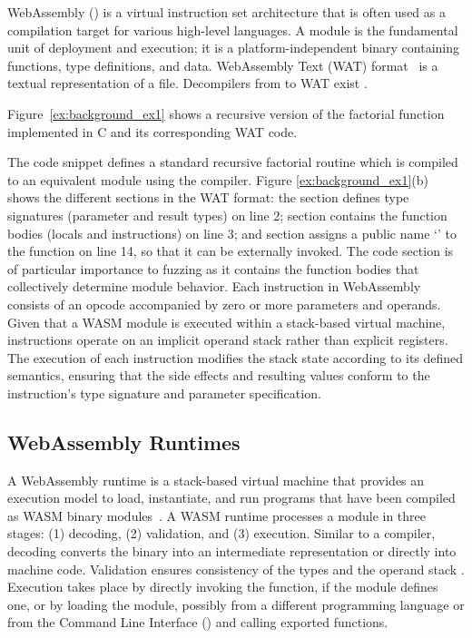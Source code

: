 \documentclass[lettersize,journal]{IEEEtran}
\begin{document}
WebAssembly (\wasm{}) is a virtual instruction set architecture that is often used as a compilation target for various high-level languages. A \wasm{} module is the fundamental unit of deployment and execution; it is a platform-independent binary containing functions, type definitions, and data. WebAssembly Text (WAT) format~\cite{spec_wat} is a textual representation of a \wasm{} file. Decompilers from \wasm{} to WAT exist \cite{wasm_to_wat, wasm_tools}. 

Figure~\ref{ex:background_ex1} shows a recursive version of the factorial function implemented in C and its corresponding WAT code.



The code snippet defines a standard recursive factorial routine which is compiled to an equivalent \wasm{} module using the  compiler. Figure \ref{ex:background_ex1}(b) shows the different sections in the WAT format: the  section defines type signatures (parameter and result types) on line 2;
 section contains the function bodies (locals and instructions) on line 3; and  section assigns a public name `' to the function on line 14, so that it can be externally invoked.
The \wasm{} code section is of particular importance to fuzzing as it contains the function bodies that collectively determine module behavior.
Each instruction in WebAssembly consists of an opcode accompanied by zero or more parameters and operands. Given that a WASM module is executed within a stack-based virtual machine, instructions operate on an implicit operand stack rather than explicit registers.
The execution of each instruction modifies the stack state according to its defined semantics, ensuring that the side effects and resulting values conform to the instruction’s type signature and parameter specification.

\subsection{WebAssembly Runtimes}
\label{sec:background_runtimes}
A WebAssembly runtime is a stack-based virtual machine that provides an execution model to load, instantiate, and run programs that have been compiled as WASM binary modules~\cite{zhang2024research}. A WASM runtime processes a module in three stages: (1) decoding, (2) validation, and (3) execution. Similar to a compiler, decoding converts the binary into an intermediate representation or directly into machine code. Validation ensures consistency of the types and the operand stack \cite{spec_concepts}. Execution takes place by directly invoking the  function, if the module defines one, 
or by loading the module, possibly from a different programming language or from the Command Line Interface () and calling exported functions.
\end{document}
